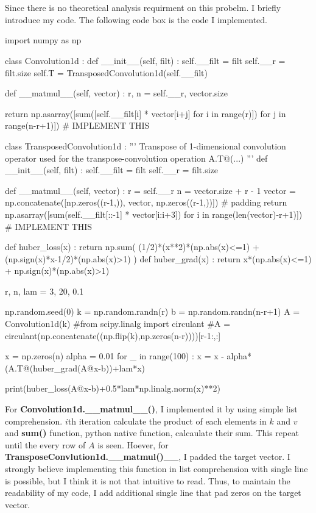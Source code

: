 \documentclass[10pt]{article}
\begin{document}
\section{}
Since there is no theoretical analysis requirment on this probelm. I briefly introduce my code. The following code box is the code I implemented. 

\begin{python}
    import numpy as np

    class Convolution1d :
        def __init__(self, filt) :
            self.__filt = filt
            self.__r = filt.size
            self.T = TransposedConvolution1d(self.__filt)

        def __matmul__(self, vector) :
            r, n = self.__r, vector.size
            
            return np.asarray([sum([self.__filt[i] * vector[i+j] for i in range(r)]) for j in range(n-r+1)])  # IMPLEMENT THIS
        
    class TransposedConvolution1d :
        '''
        Transpose of 1-dimensional convolution operator used for the 
        transpose-convolution operation A.T@(...)
        '''
        def __init__(self, filt) :
            self.__filt = filt
            self.__r = filt.size

        def __matmul__(self, vector) :
            r = self.__r
            n = vector.size + r - 1
            vector = np.concatenate([np.zeros((r-1,)), vector, np.zeros((r-1,))]) # padding
            return  np.asarray([sum(self.__filt[::-1] * vector[i:i+3]) for i in range(len(vector)-r+1)]) # IMPLEMENT THIS

    def huber_loss(x) :
        return np.sum( (1/2)*(x**2)*(np.abs(x)<=1) + (np.sign(x)*x-1/2)*(np.abs(x)>1) )
    def huber_grad(x) :
        return x*(np.abs(x)<=1) + np.sign(x)*(np.abs(x)>1)


    r, n, lam = 3, 20, 0.1

    np.random.seed(0)
    k = np.random.randn(r)
    b = np.random.randn(n-r+1)
    A = Convolution1d(k)
    #from scipy.linalg import circulant
    #A = circulant(np.concatenate((np.flip(k),np.zeros(n-r))))[r-1:,:]


    x = np.zeros(n)
    alpha = 0.01
    for _ in range(100) :
        x = x - alpha*(A.T@(huber_grad(A@x-b))+lam*x)

    print(huber_loss(A@x-b)+0.5*lam*np.linalg.norm(x)**2)
\end{python}

For \textbf{Convolution1d.\_\_matmul\_\_()}, I implemented it by using simple list comprehension. $i$th iteration calculate the product of each elements in $k$ and $v$ and \textbf{sum()} function, python native function, calcaulate their sum.
This repeat until the every row of $A$ is seen. Hoever, for \textbf{TransposeConvlution1d.\_\_matmul()\_\_}, I padded the target vector. I strongly believe implementing this function in list comprehension with single line is possible, but 
I think it is not that intuitive to read. Thus, to maintain the readability of my code, I add additional single line that pad zeros on the target vector. 


\end{document}
